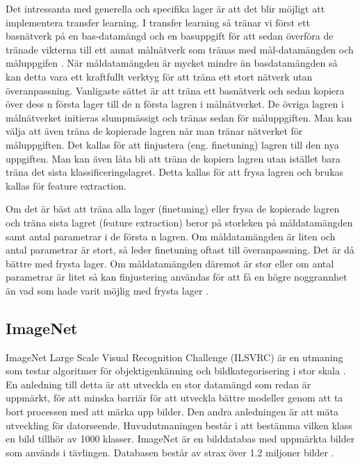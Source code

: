 \documentclass[]{kththesis}
\begin{document}
Det intressanta med generella och specifika lager är att det blir möjligt att implementera transfer learning. I transfer learning så tränar vi först ett basnätverk på en bas-datamängd och en basuppgift för att sedan överföra de tränade vikterna till ett annat målnätverk som tränas med mål-datamängden och måluppgifen \parencite{yosinski2014transferable}. När måldatamängden är mycket mindre än basdatamängden så kan detta vara ett kraftfullt verktyg för att träna ett stort nätverk utan överanpassning. Vanligaste sättet är att träna ett basnätverk och sedan kopiera över dess n första lager till de n första lagren i målnätverket. De övriga lagren i målnätverket initieras slumpmässigt och tränas sedan för måluppgiften. Man kan välja att även träna de kopierade lagren när man tränar nätverket för måluppgiften. Det kallas för att finjustera (eng. finetuning) lagren till den nya uppgiften. Man kan även låta bli att träna de kopiera lagren utan istället bara träna det sista klassificeringslagret. Detta kallas för att frysa lagren och brukas kallas för feature extraction.

Om det är bäst att träna alla lager (finetuning) eller frysa de kopierade lagren och träna sista lagret (feature extraction) beror på storleken på måldatamängden samt antal parametrar i de första n lagren. Om måldatamängden är liten och antal parametrar är stort, så leder finetuning oftast till överanpassning. Det är då bättre med frysta lager. Om måldatamängden däremot är stor eller om antal parametrar är litet så kan finjustering användas för att få en högre noggrannhet än vad som hade varit möjlig med frysta lager \parencite{yosinski2014transferable}. 

\subsection{ImageNet}
ImageNet Large Scale Visual Recognition Challenge (ILSVRC) är en utmaning som testar algoritmer för objektigenkänning och bildkategorisering i stor skala \parencite{ILSVRC15}. En anledning till detta är att utveckla en stor datamängd som redan är uppmärkt, för att minska barriär för att utveckla bättre modeller genom att ta bort processen med att märka upp bilder. Den andra anledningen är att mäta utveckling för datorseende. Huvudutmaningen består i att bestämma vilken klass en bild tillhör av 1000 klasser. ImageNet är en bilddatabas med uppmärkta bilder som används i tävlingen. Databasen består av strax över 1.2 miljoner bilder \parencite{huh2016makes}.
\end{document}
